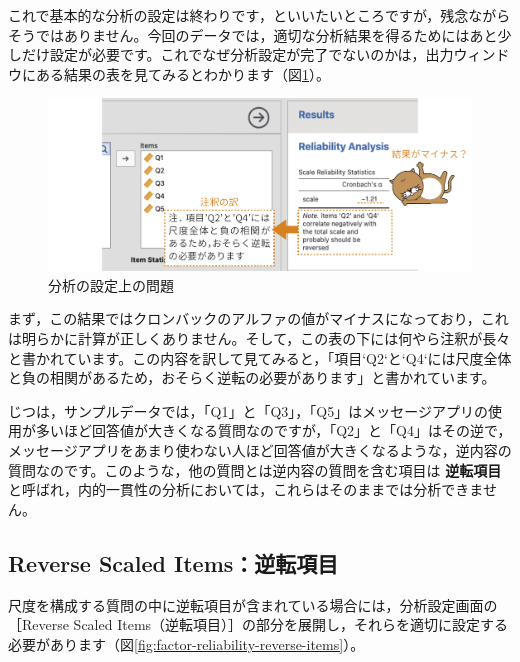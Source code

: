 \documentclass[
  12pt,
  a5jpaper,
  lualatex, ja=standard]{bxjsbook}
\renewcommand{\emph}[1]{\textbf{\color{emph} #1}}
\begin{document}
これで基本的な分析の設定は終わりです，といいたいところですが，残念ながらそうではありません。今回のデータでは，適切な分析結果を得るためにはあと少しだけ設定が必要です。これでなぜ分析設定が完了でないのかは，出力ウィンドウにある結果の表を見てみるとわかります（図\ref{fig:factor-reliability-error}）。

\begin{figure}[!ht]

{\centering \includegraphics[width=1\linewidth]{images/factor/reliability-error} 

}

\caption{分析の設定上の問題}\label{fig:factor-reliability-error}
\end{figure}

まず，この結果ではクロンバックのアルファの値がマイナスになっており，これは明らかに計算が正しくありません。そして，この表の下には何やら注釈が長々と書かれています。この内容を訳して見てみると，「項目`Q2`と`Q4`には尺度全体と負の相関があるため，おそらく逆転の必要があります」と書かれています。

じつは，サンプルデータでは，「Q1」と「Q3」，「Q5」はメッセージアプリの使用が多いほど回答値が大きくなる質問なのですが，「Q2」と「Q4」はその逆で，メッセージアプリをあまり使わない人ほど回答値が大きくなるような，逆内容の質問なのです。このような，他の質問とは逆内容の質問を含む項目は\emph{逆転項目}と呼ばれ，内的一貫性の分析においては，これらはそのままでは分析できません。

\hypertarget{sub:factor-reliability-reverse-scaled-items}{%
\subsection{Reverse Scaled Items：逆転項目}\label{sub:factor-reliability-reverse-scaled-items}}

尺度を構成する質問の中に逆転項目が含まれている場合には，分析設定画面の［Reverse Scaled Items（逆転項目）］の部分を展開し，それらを適切に設定する必要があります（図\ref{fig:factor-reliability-reverse-items}）。
\end{document}
